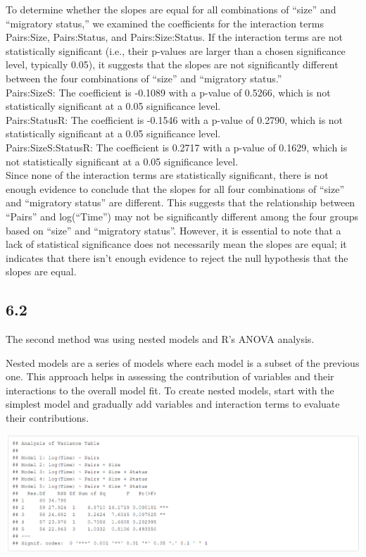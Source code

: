 \documentclass{article}
\begin{document}
To determine whether the slopes are equal for all combinations of “size” and “migratory status,” we examined the coefficients for the interaction terms Pairs:Size, Pairs:Status, and Pairs:Size:Status. If the interaction terms are not statistically significant (i.e., their p-values are larger than a chosen significance level, typically 0.05), it suggests that the slopes are not significantly different between the four combinations of “size” and “migratory status.” \\

Pairs:SizeS: The coefficient is -0.1089 with a p-value of 0.5266, which is not statistically significant at a 0.05 significance level. \\

Pairs:StatusR: The coefficient is -0.1546 with a p-value of 0.2790, which is not statistically significant at a 0.05 significance level. \\

Pairs:SizeS:StatusR: The coefficient is 0.2717 with a p-value of 0.1629, which is not statistically significant at a 0.05 significance level. \\

Since none of the interaction terms are statistically significant, there is not enough evidence to conclude that the slopes for all four combinations of “size” and “migratory status” are different. This suggests that the relationship between “Pairs” and log(“Time”) may not be significantly different among the four groups based on “size” and “migratory status”. However, it is essential to note that a lack of statistical significance does not necessarily mean the slopes are equal; it indicates that there isn’t enough evidence to reject the null hypothesis that the slopes are equal.

\subsection*{6.2}

The second method was using nested models and R's ANOVA analysis.

Nested models are a series of models where each model is a subset of the previous one. This approach helps in assessing the contribution of variables and their interactions to the overall model fit. To create nested models, start with the simplest model and gradually add variables and interaction terms to evaluate their contributions.


\includegraphics[scale=0.5]{tables/variance-table.png}
\end{document}

